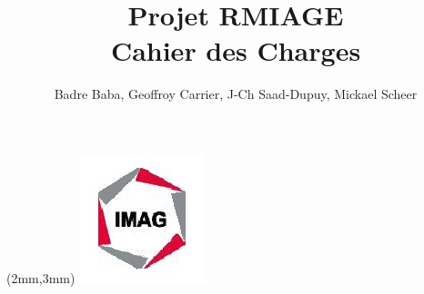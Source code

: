 \documentclass[a4paper,10pt,twoside]{article}
\begin{document}
\title{Projet RMIAGE\\ \Huge{Cahier des Charges}}
\author{
	Badre Baba, Geoffroy Carrier, J-Ch Saad-Dupuy, Mickael Scheer
}

\begin{center}
\begin{textblock*}{35cm}(2mm,3mm)
\includegraphics[scale=0.8]{imag_logo.png}
\end{textblock*}
\end{center}
 
\maketitle






\end{document}
